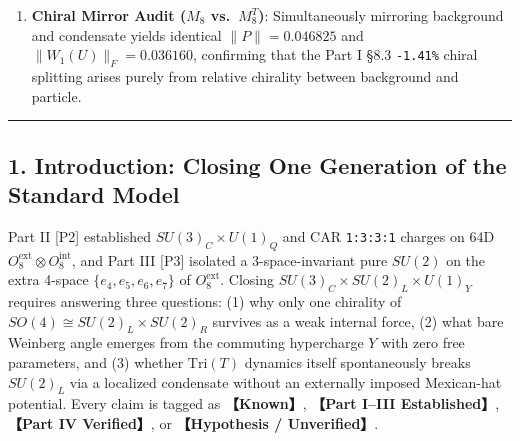 \documentclass[
  a4paper,
]{article}
\begin{document}
\begin{enumerate}
{  and 4×4 Electroweak Spectrum (\(\gamma, W^\pm, Z^0\))}: Without
  assuming \(SU(5)/SO(10)\), raw 64D trace ratios give
  \(\mathrm{Tr}(T_3^2)=8\), \(\mathrm{Tr}(Y^2)=40/3\),
  \(\mathrm{Tr}(Q_{\mathrm{em}}^2)=64/3\), yielding
  \textbf{\(\sin^2\theta_W^{\mathrm{bare}} = 3/8 = 0.375000\)} (matching
  the canonical GUT value to 6 digits). Substituting this parameter-free
  geometric ratio \(g'/g = \sqrt{3/5}\) into the 4×4 mass-squared matrix
  \(M^2\) of the complex Higgs doublet
  (\(T_3^L=-1/2, Y=+1/2 \Rightarrow Q_{\mathrm{em}}=0\)) produces
  eigenvalues
  \([m_\gamma^2, m_{W^+}^2, m_{W^-}^2, m_Z^2] = [\mathbf{-2.082\times 10^{-17}}, \mathbf{0.250000}, \mathbf{0.250000}, \mathbf{0.400000}]\)
  and
  \textbf{\(m_W^2/m_Z^2 = 5/8 = 0.625000 = \cos^2\theta_W^{\mathrm{bare}}\)}.
\item
  \textbf{Chiral Mirror Audit (\(M_8\) vs.~\(M_8^T\))}: Simultaneously
  mirroring background and condensate yields identical
  \(\|P\|=0.046825\) and \(\|W_1(U)\|_F=0.036160\), confirming that the
  Part I §8.3 \texttt{-1.41\%} chiral splitting arises purely from
  relative chirality between background and particle.
\end{enumerate}

\begin{center}\rule{0.5\linewidth}{0.5pt}\end{center}

\subsection{1. Introduction: Closing One Generation of the Standard
Model}\label{introduction-closing-one-generation-of-the-standard-model}

Part II {[}P2{]} established \(SU(3)_C \times U(1)_Q\) and CAR
\texttt{1:3:3:1} charges on 64D
\(O_8^{\mathrm{ext}}\otimes O_8^{\mathrm{int}}\), and Part III {[}P3{]}
isolated a 3-space-invariant pure \(SU(2)\) on the extra 4-space
\(\{e_4,e_5,e_6,e_7\}\) of \(O_8^{\mathrm{ext}}\). Closing
\(SU(3)_C \times SU(2)_L \times U(1)_Y\) requires answering three
questions: (1) why only one chirality of
\(SO(4) \cong SU(2)_L \times SU(2)_R\) survives as a weak internal
force, (2) what bare Weinberg angle emerges from the commuting
hypercharge \(Y\) with zero free parameters, and (3) whether
\(\mathrm{Tri}(T)\) dynamics itself spontaneously breaks \(SU(2)_L\) via
a localized condensate without an externally imposed Mexican-hat
potential. Every claim is tagged as \textbf{【Known】}, \textbf{【Part
I--III Established】}, \textbf{【Part IV Verified】}, or
\textbf{【Hypothesis / Unverified】}.
\end{document}
